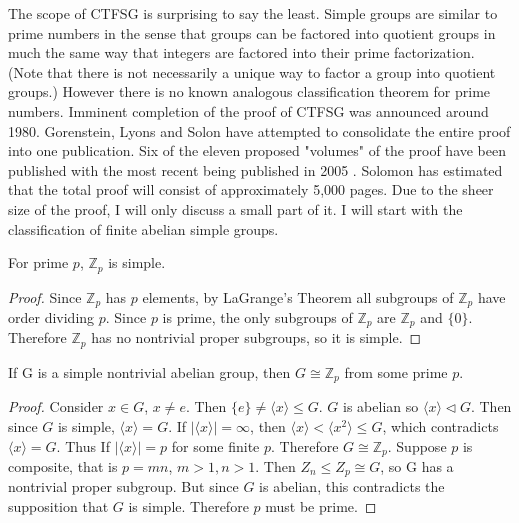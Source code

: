 \documentclass[a4paper]{article}
\begin{document}
The scope of CTFSG is surprising to say the least. Simple groups are similar to prime numbers in the sense that groups can be factored into quotient groups in much the same way that integers are factored into their prime factorization. (Note that there is not necessarily a unique way to factor a group into quotient groups.) However there is no known analogous classification theorem for prime numbers. Imminent completion of the proof of CTFSG was announced around 1980. Gorenstein, Lyons and Solon have attempted to consolidate the entire proof into one publication. Six of the eleven proposed "volumes" of the proof have been published with the most recent being published in 2005 \cite{number6}. Solomon has estimated that the total proof will consist of approximately 5,000 pages. Due to the sheer size of the proof, I will only discuss a small part of it. I will start with the classification of finite abelian simple groups.



\begin{theorem}For prime $p$, $\mathbb{Z}_p$ is simple.
\end{theorem}
\begin{proof}
Since $\mathbb{Z}_p$ has $p$ elements, by LaGrange's Theorem all subgroups of $\mathbb{Z}_p$ have order dividing $p$. Since $p$ is prime, the only subgroups of $\mathbb{Z}_p$ are $\mathbb{Z}_p$ and $\{0\}$. Therefore $\mathbb{Z}_p$ has no nontrivial proper subgroups, so it is simple.
\end{proof}

\begin{theorem}
If G is a simple nontrivial abelian group, then $G \cong \mathbb{Z}_p$ from some prime $p$.
\end{theorem}
\begin{proof}
Consider $x \in G$, $x \neq e$. Then $\{ e \} \neq \langle x \rangle \le G$. $G$ is abelian so $\langle x \rangle \triangleleft G$. Then since $G$ is simple, $\langle x \rangle = G$. If $|\langle x \rangle| = \infty$, then $\langle x \rangle < \langle x^2 \rangle \leq G$, which contradicts $\langle x \rangle = G$. Thus If $|\langle x \rangle| = p$ for some finite $p$. Therefore $G \cong \mathbb{Z}_p$. Suppose $p$ is composite, that is $p = m n$, $m > 1, n > 1$. Then $Z_n \leq Z_p \cong G$, so G has a nontrivial proper subgroup. But since $G$ is abelian, this contradicts the supposition that $G$ is simple. Therefore $p$ must be prime.
\end{proof}
\end{document}
